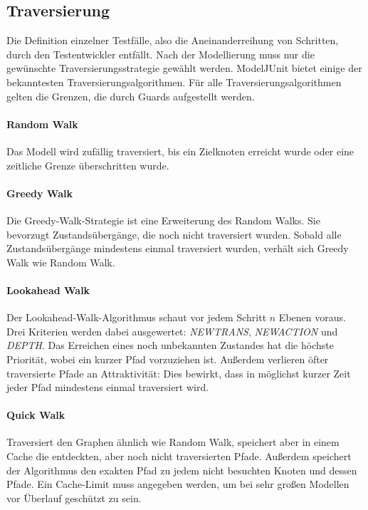 \subsection{Traversierung}
Die Definition einzelner Testfälle, also die Aneinanderreihung von Schritten, durch den Testentwickler entfällt. Nach der Modellierung muss nur die gewünschte Traversierungsstrategie gewählt werden. ModelJUnit bietet einige der bekanntesten Traversierungsalgorithmen. Für alle Traversierungsalgorithmen gelten die Grenzen, die durch Guards aufgestellt werden.

\paragraph{Random Walk}
Das Modell wird zufällig traversiert, bis ein Zielknoten erreicht wurde oder eine zeitliche Grenze überschritten wurde.

\paragraph{Greedy Walk}
Die Greedy-Walk-Strategie ist eine Erweiterung des Random Walks. Sie bevorzugt Zustandsübergänge, die noch nicht traversiert wurden. Sobald alle Zustandsübergänge mindestens einmal traversiert wurden, verhält sich Greedy Walk wie Random Walk.

\paragraph{Lookahead Walk}
Der Lookahead-Walk-Algorithmus schaut vor jedem Schritt $n$ Ebenen voraus. Drei Kriterien werden dabei ausgewertet: \textit{NEWTRANS}, \textit{NEWACTION} und \textit{DEPTH}. Das Erreichen eines noch unbekannten Zustandes hat die höchste Priorität, wobei ein kurzer Pfad vorzuziehen ist. Außerdem verlieren öfter traversierte Pfade an Attraktivität: Dies bewirkt, dass in möglichst kurzer Zeit jeder Pfad mindestens einmal traversiert wird.

\paragraph{Quick Walk}
Traversiert den Graphen ähnlich wie Random Walk, speichert aber in einem Cache die entdeckten, aber noch nicht traversierten Pfade. Außerdem speichert der Algorithmus den exakten Pfad zu jedem nicht besuchten Knoten und dessen Pfade. Ein Cache-Limit muss angegeben werden, um bei sehr großen Modellen vor Überlauf geschützt zu sein.

